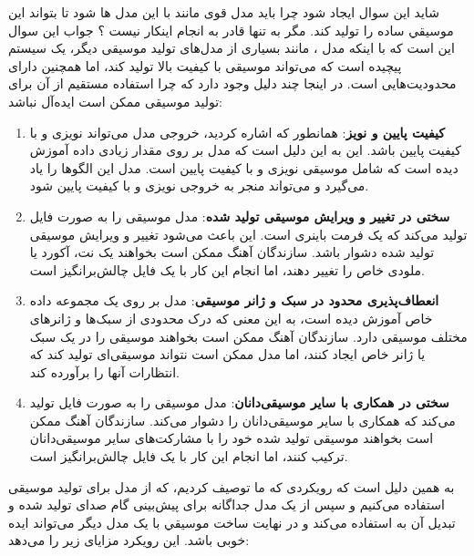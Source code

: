 شاید این سوال ایجاد شود چرا باید مدل قوی مانند  با این مدل ها  شود تا بتواند این موسیقي ساده را تولید کند. مگر به تنها قادر به انجام اینکار نیست ؟ جواب این سوال این است که با اینکه
مدل ، مانند بسیاری از مدل‌های تولید موسیقی دیگر، یک سیستم پیچیده
است که می‌تواند موسیقی با کیفیت بالا تولید کند، اما همچنین دارای
محدودیت‌هایی است. در اینجا چند دلیل وجود دارد که چرا استفاده مستقیم از آن
برای تولید موسیقی ممکن است ایده‌آل نباشد:


\begin{enumerate}
      \def\labelenumi{\arabic{enumi}.}
      \item
            \textbf{کیفیت پایین و نویز}: همانطور که اشاره کردید، خروجی مدل
             می‌تواند نویزی و با کیفیت پایین باشد. این به این دلیل است که
            مدل بر روی مقدار زیادی داده آموزش دیده است که شامل موسیقی نویزی و با
            کیفیت پایین است. مدل این الگوها را یاد می‌گیرد و می‌تواند منجر به خروجی
            نویزی و با کیفیت پایین شود.
      \item
            \textbf{سختی در تغییر و ویرایش موسیقی تولید شده}: مدل  موسیقی
            را به صورت فایل  تولید می‌کند که یک فرمت باینری است. این باعث می‌شود
            تغییر و ویرایش موسیقی تولید شده دشوار باشد. سازندگان آهنگ ممکن است
            بخواهند یک نت، آکورد یا ملودی خاص را تغییر دهند، اما انجام این کار با
            یک فایل  چالش‌برانگیز است.
      \item
            \textbf{انعطاف‌پذیری محدود در سبک و ژانر موسیقی}: مدل  بر روی
            یک مجموعه داده خاص آموزش دیده است، به این معنی که درک محدودی از سبک‌ها
            و ژانرهای مختلف موسیقی دارد. سازندگان آهنگ ممکن است بخواهند موسیقی را
            در یک سبک یا ژانر خاص ایجاد کنند، اما مدل  ممکن است نتواند
            موسیقی‌ای تولید کند که انتظارات آنها را برآورده کند.
      \item
            \textbf{سختی در همکاری با سایر موسیقی‌دانان}: مدل  موسیقی را به
            صورت فایل  تولید می‌کند که همکاری با سایر موسیقی‌دانان را دشوار
            می‌کند. سازندگان آهنگ ممکن است بخواهند موسیقی تولید شده خود را با
            مشارکت‌های سایر موسیقی‌دانان ترکیب کنند، اما انجام این کار با یک فایل
             چالش‌برانگیز است.
\end{enumerate}

به همین دلیل است که رویکردی که ما توصیف کردیم، که از مدل  برای
تولید موسیقی استفاده می‌کنیم و سپس از یک مدل جداگانه
برای پیش‌بینی گام صدای تولید شده و تبدیل آن
به  استفاده می‌کند و در نهایت ساخت موسیقي  با یک مدل دیگر می‌تواند ایده خوبی باشد. این رویکرد مزایای زیر را می‌دهد:

